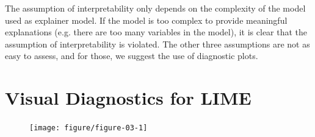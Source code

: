 \documentclass[AMS,STIX2COL]{WileyNJD-v2}\usepackage[]{graphicx}\usepackage[]{color}
\newenvironment{knitrout}{}{} %
\providecommand{\DIFaddend}{} %
\providecommand{\DIFaddbeginFL}{} %
\providecommand{\DIFaddendFL}{} %
\providecommand{\DIFdelbeginFL}{} %
\providecommand{\DIFdelendFL}{} %
\newcommand{\DIFscaledelfig}{0.5}
\newlength{\DIFdelgraphicswidth} %
\newlength{\DIFdelgraphicsheight} %
\newcommand{\DIFaddincludegraphics}[2][]{{\color{blue}\fbox{\DIFOincludegraphics[#1]{#2}}}} %
\newcommand{\DIFdelincludegraphics}[2][]{%
\sbox{\DIFdelgraphicsbox}{\DIFOincludegraphics[#1]{#2}}%
\settoboxwidth{\DIFdelgraphicswidth}{\DIFdelgraphicsbox} %
\settoboxtotalheight{\DIFdelgraphicsheight}{\DIFdelgraphicsbox} %
\scalebox{\DIFscaledelfig}{%
\parbox[b]{\DIFdelgraphicswidth}{\usebox{\DIFdelgraphicsbox}\\[-\baselineskip] \rule{\DIFdelgraphicswidth}{0em}}\llap{\resizebox{\DIFdelgraphicswidth}{\DIFdelgraphicsheight}{%
\setlength{\unitlength}{\DIFdelgraphicswidth}%
\begin{picture}(1,1)%
\thicklines\linethickness{2pt} %
{\color[rgb]{1,0,0}\put(0,0){\framebox(1,1){}}}%
{\color[rgb]{1,0,0}\put(0,0){\line( 1,1){1}}}%
{\color[rgb]{1,0,0}\put(0,1){\line(1,-1){1}}}%
\end{picture}%
}\hspace*{3pt}}} %
} %
\DeclareRobustCommand{\DIFaddend}{\DIFOaddend \let\includegraphics\DIFOincludegraphics} %
\DeclareRobustCommand{\DIFaddbeginFL}{\DIFOaddbeginFL \let\includegraphics\DIFaddincludegraphics} %
\DeclareRobustCommand{\DIFaddendFL}{\DIFOaddendFL \let\includegraphics\DIFOincludegraphics} %
\DeclareRobustCommand{\DIFdelbeginFL}{\DIFOdelbeginFL \let\includegraphics\DIFdelincludegraphics} %
\DeclareRobustCommand{\DIFdelendFL}{\DIFOaddendFL \let\includegraphics\DIFOincludegraphics} %
\begin{document}
\DIFaddend The assumption of interpretability only depends on the complexity of the model used as explainer model. If the model is too complex to provide meaningful explanations (e.g. there are too many variables in the model), it is clear that the assumption of interpretability is violated. The other three assumptions are not as easy to assess, and for those, we suggest the use of diagnostic plots.

\section{Visual Diagnostics for LIME} \label{diagnostics}







\begin{figure}[!thp]
\DIFdelbeginFL %
\DIFdelendFL \begin{knitrout}
\color{fgcolor}

{\centering \DIFdelbeginFL %
\DIFdelendFL \DIFaddbeginFL \texttt{[image: figure/figure-03-1]}
\DIFaddendFL

}




\end{knitrout}
\end{figure}
\end{document}

